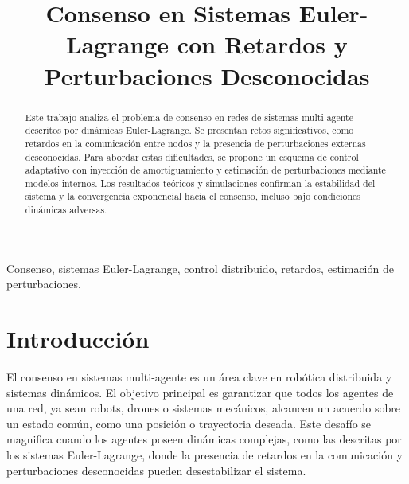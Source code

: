 \documentclass[conference]{IEEEtran}
\begin{document}
\title{Consenso en Sistemas Euler-Lagrange con Retardos y Perturbaciones Desconocidas	%
}

\author{
	\and
}

\maketitle

\begin{abstract}
    Este trabajo analiza el problema de consenso en redes de sistemas multi-agente descritos por dinámicas Euler-Lagrange. Se presentan retos significativos, como retardos en la comunicación entre nodos y la presencia de perturbaciones externas desconocidas. Para abordar estas dificultades, se propone un esquema de control adaptativo con inyección de amortiguamiento y estimación de perturbaciones mediante modelos internos. Los resultados teóricos y simulaciones confirman la estabilidad del sistema y la convergencia exponencial hacia el consenso, incluso bajo condiciones dinámicas adversas.
\end{abstract}

\begin{IEEEkeywords}
    Consenso, sistemas Euler-Lagrange, control distribuido, retardos, estimación de perturbaciones.
\end{IEEEkeywords}

\section*{Introducción}

El consenso en sistemas multi-agente es un área clave en robótica distribuida y sistemas dinámicos. El objetivo principal es garantizar que todos los agentes de una red, ya sean robots, drones o sistemas mecánicos, alcancen un acuerdo sobre un estado común, como una posición o trayectoria deseada. Este desafío se magnifica cuando los agentes poseen dinámicas complejas, como las descritas por los sistemas Euler-Lagrange, donde la presencia de retardos en la comunicación y perturbaciones desconocidas pueden desestabilizar el sistema.
\end{document}
